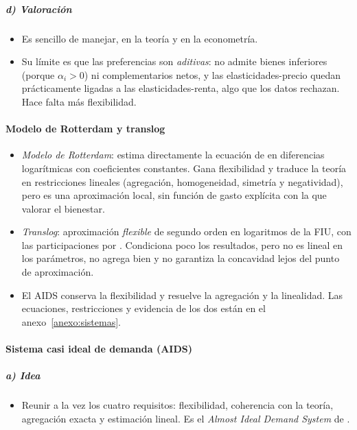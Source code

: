 \documentclass[11pt]{article}
\begin{document}
\subparagraph{d) Valoración}

\begin{itemize}
\item Es sencillo de manejar, en la teoría y en la econometría.
\item Su límite es que las preferencias son \emph{aditivas}: no admite bienes inferiores (porque $\alpha_i>0$) ni complementarios netos, y las elasticidades-precio quedan prácticamente ligadas a las elasticidades-renta, algo que los datos rechazan. Hace falta más flexibilidad.
\end{itemize}

\paragraph{Modelo de Rotterdam y translog}

\begin{itemize}
\item \emph{Modelo de Rotterdam}\nocite{Barten1964Consumer,Theil1965Information}: estima directamente la ecuación de  en diferencias logarítmicas con coeficientes constantes. Gana flexibilidad y traduce la teoría en restricciones lineales (agregación, homogeneidad, simetría y negatividad), pero es una aproximación local, sin función de gasto explícita con la que valorar el bienestar.
\item \emph{Translog}\nocite{ChristensenJorgensonLau1975Utility}: aproximación \emph{flexible} de segundo orden en logaritmos de la FIU, con las participaciones por . Condiciona poco los resultados, pero no es lineal en los parámetros, no agrega bien y no garantiza la concavidad lejos del punto de aproximación.
\item El AIDS conserva la flexibilidad y resuelve la agregación y la linealidad. Las ecuaciones, restricciones y evidencia de los dos están en el anexo~\ref{anexo:sistemas}.
\end{itemize}

\paragraph{Sistema casi ideal de demanda (AIDS)}

\subparagraph{a) Idea}

\begin{itemize}
\item Reunir a la vez los cuatro requisitos: flexibilidad, coherencia con la teoría, agregación exacta y estimación lineal. Es el \emph{Almost Ideal Demand System} de \textcite{DeatonMuellbauer1980AIDS}.
\end{itemize}
\end{document}
